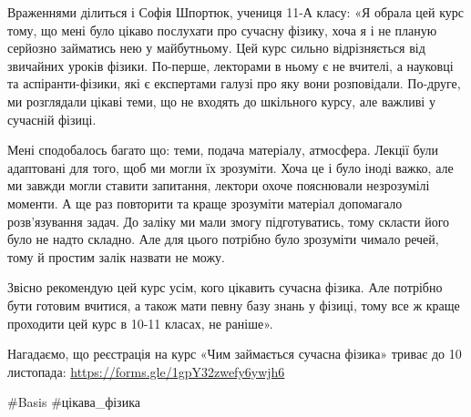 Враженнями ділиться і Софія Шпортюк, учениця 11-А класу: «Я обрала цей курс
тому, що мені було цікаво послухати про сучасну фізику, хоча я і не планую
серйозно займатись нею у майбутньому. Цей курс сильно відрізняється від
звичайних уроків фізики. По-перше, лекторами в ньому є не вчителі, а науковці
та аспіранти-фізики, які є експертами галузі про яку вони розповідали.
По-друге, ми розглядали цікаві теми, що не входять до шкільного курсу, але
важливі у сучасній фізиці.

Мені сподобалось багато що: теми, подача матеріалу, атмосфера. Лекції були
адаптовані для того, щоб ми могли їх зрозуміти. Хоча це і було іноді важко, але
ми завжди могли ставити запитання, лектори охоче пояснювали незрозумілі
моменти. А ще раз повторити та краще зрозуміти матеріал допомагало
розв’язування задач. До заліку ми мали змогу підготуватись, тому скласти його
було не надто складно. Але для цього потрібно було зрозуміти чимало речей, тому
й простим залік назвати не можу. 

Звісно рекомендую цей курс усім, кого цікавить сучасна фізика. Але потрібно
бути готовим вчитися, а також мати певну базу знань у фізиці, тому все ж краще
проходити цей курс в 10-11 класах, не  раніше».

Нагадаємо, що реєстрація на курс «Чим займається сучасна фізика» триває до 10
листопада: \url{https://forms.gle/1gpY32zwefy6ywjh6}

\#Basis \#цікава\_фізика
